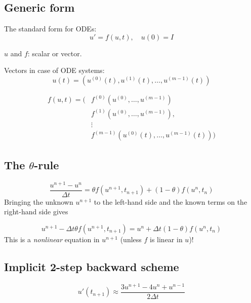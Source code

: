 \documentclass[%
oneside,                 %
final,                   %
10pt]{article}
\begin{document}
\subsection*{Generic form}

The standard form for ODEs:
\begin{equation}
u' = f(u,t),\quad u(0)=I
\label{decay:ode:general}
\end{equation}

$u$ and $f$: scalar or vector.

Vectors in case of ODE systems:
\[ u(t) = (u^{(0)}(t),u^{(1)}(t),\ldots,u^{(m-1)}(t))   \]

\begin{align*}
f(u, t) = ( & f^{(0)}(u^{(0)},\ldots,u^{(m-1)})\\ 
            & f^{(1)}(u^{(0)},\ldots,u^{(m-1)}),\\ 
            & \vdots\\ 
            & f^{(m-1)}(u^{(0)}(t),\ldots,u^{(m-1)}(t)))
\end{align*}

\subsection*{The $\theta$-rule}

\begin{equation}
\frac{u^{n+1}-u^n}{\Delta t} = \theta f(u^{n+1},t_{n+1}) +
(1-\theta)f(u^n, t_n)
\label{decay:fd2:theta}
\end{equation}
Bringing the unknown $u^{n+1}$ to the left-hand side and the known terms
on the right-hand side gives

   

\begin{equation}
u^{n+1} - \Delta t \theta f(u^{n+1},t_{n+1}) =
u^n + \Delta t(1-\theta)f(u^n, t_n)
\end{equation}
This is a \emph{nonlinear} equation in $u^{n+1}$ (unless $f$ is linear in $u$)!


\subsection*{Implicit 2-step backward scheme}

 

\[ u'(t_{n+1}) \approx \frac{3u^{n+1} - 4u^{n} + u^{n-1}}{2\Delta t}\]
\end{document}
